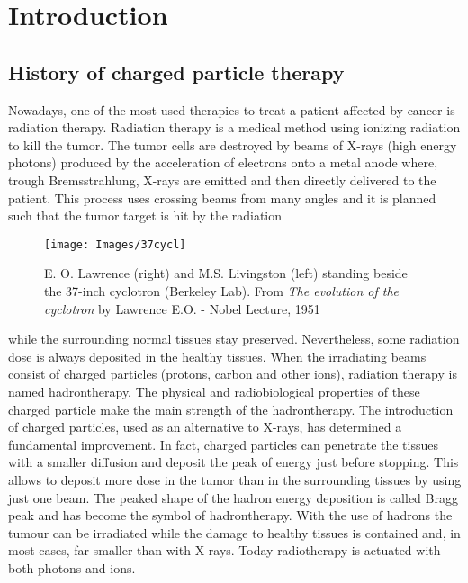 \documentclass[12pt, a4paper, twoside]{book}
\begin{document}
\tableofcontents

\chapter{Introduction} %

\section{History of charged particle therapy}

Nowadays, one of the most used therapies to treat a patient affected by cancer is radiation therapy. Radiation therapy is a medical method using ionizing radiation to kill the tumor. The tumor cells are destroyed by beams of X-rays (high energy photons) produced by the acceleration of electrons onto a metal anode where, trough Bremsstrahlung, X-rays are emitted and then directly delivered to the patient. 
This process uses crossing beams from many angles and it is planned such that the tumor target is hit by the radiation
\begin{wrapfigure}{r}{.5\textwidth}
\centering
{\texttt{[image: Images/37cycl]}}
\caption{E. O. Lawrence (right) and M.S. Livingston (left) standing beside the 37-inch
cyclotron (Berkeley Lab). From \emph{The evolution of the cyclotron} by Lawrence E.O. -
Nobel Lecture, 1951}
\label{fig:37cycl}
\vspace{-5mm}
\end{wrapfigure}
\noindent while the surrounding normal tissues stay preserved. Nevertheless, some radiation dose is always deposited in the healthy tissues.
When the irradiating beams consist of charged particles (protons, carbon and other ions), radiation therapy is named hadrontherapy. The physical and radiobiological properties of these charged particle make the main strength of the hadrontherapy.
The introduction of charged particles, used as an alternative to X-rays, has determined a fundamental improvement. In fact, charged particles can penetrate the tissues with a smaller diffusion and deposit the peak of energy just before stopping. This allows to deposit more dose in the tumor than in the surrounding tissues by using just one beam.
The peaked shape of the hadron energy deposition is called Bragg peak and has become the symbol of hadrontherapy. With the use of hadrons the tumour can be irradiated while the damage to healthy tissues is contained and, in most cases, far smaller than with X-rays. Today radiotherapy is actuated with both photons and ions.
\end{document}
